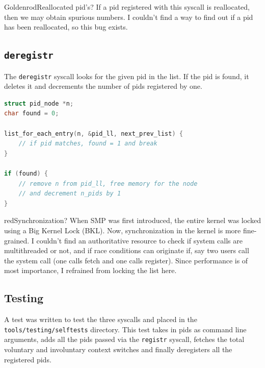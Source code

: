 \documentclass[12pt]{article}
\begin{document}
\begin{mybox}{Goldenrod}{Reallocated pid's?}
If a pid registered with this syscall is reallocated, then we may obtain spurious
numbers. I couldn't find a way to find out if a pid has been reallocated, so
this bug exists.
\end{mybox}

\subsection{\texttt{deregistr}}

The \texttt{deregistr} syscall looks for the given pid in the list. If the pid
is found, it deletes it and decrements the number of pids registered by one.

\begin{lstlisting}[language=C]
struct pid_node *n;
char found = 0;

list_for_each_entry(n, &pid_ll, next_prev_list) {
    // if pid matches, found = 1 and break
}

if (found) {
    // remove n from pid_ll, free memory for the node 
    // and decrement n_pids by 1
}
\end{lstlisting}

\begin{mybox}{red}{Synchronization?}
When SMP was first introduced, the entire kernel was locked using a Big Kernel 
Lock (BKL). Now, synchronization in the kernel is more fine-grained. I couldn't
find an authoritative resource to check if system calls are multithreaded or 
not, and if race conditions can originate if, say two users call the system
call (one calls fetch and one calls register). Since performance is of most
importance, I refrained from locking the list here.
\end{mybox}

\subsection{Testing}

A test was written to test the three syscalls and placed in the 
\texttt{tools/testing/selftests} directory. This test takes in pids as command
line arguments, adds all the pids passed via the \texttt{registr} syscall, 
fetches the total voluntary and involuntary context switches and finally
deregisters all the registered pids.
\end{document}
